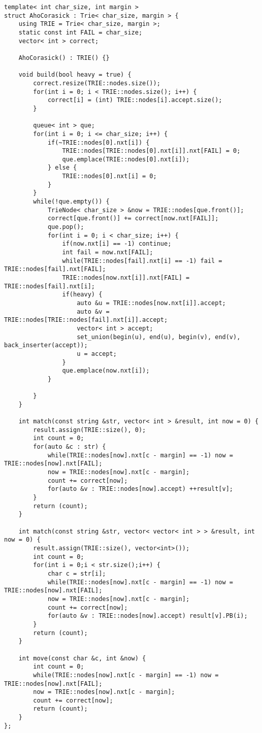 \documentclass[10pt]{article}
\begin{document}
\begin{lstlisting}
template< int char_size, int margin >
struct AhoCorasick : Trie< char_size, margin > {
	using TRIE = Trie< char_size, margin >;
	static const int FAIL = char_size;
	vector< int > correct;

	AhoCorasick() : TRIE() {}

	void build(bool heavy = true) {
		correct.resize(TRIE::nodes.size());
		for(int i = 0; i < TRIE::nodes.size(); i++) {
			correct[i] = (int) TRIE::nodes[i].accept.size();
		}

		queue< int > que;
		for(int i = 0; i <= char_size; i++) {
			if(~TRIE::nodes[0].nxt[i]) {
				TRIE::nodes[TRIE::nodes[0].nxt[i]].nxt[FAIL] = 0;
				que.emplace(TRIE::nodes[0].nxt[i]);
			} else {
				TRIE::nodes[0].nxt[i] = 0;
			}
		}
		while(!que.empty()) {
			TrieNode< char_size > &now = TRIE::nodes[que.front()];
			correct[que.front()] += correct[now.nxt[FAIL]];
			que.pop();
			for(int i = 0; i < char_size; i++) {
				if(now.nxt[i] == -1) continue;
				int fail = now.nxt[FAIL];
				while(TRIE::nodes[fail].nxt[i] == -1) fail = TRIE::nodes[fail].nxt[FAIL];
				TRIE::nodes[now.nxt[i]].nxt[FAIL] = TRIE::nodes[fail].nxt[i];
				if(heavy) {
					auto &u = TRIE::nodes[now.nxt[i]].accept;
					auto &v = TRIE::nodes[TRIE::nodes[fail].nxt[i]].accept;
					vector< int > accept;
					set_union(begin(u), end(u), begin(v), end(v), back_inserter(accept));
					u = accept;
				}
				que.emplace(now.nxt[i]);
			}

		}
	}

	int match(const string &str, vector< int > &result, int now = 0) {
		result.assign(TRIE::size(), 0);
		int count = 0;
		for(auto &c : str) {
			while(TRIE::nodes[now].nxt[c - margin] == -1) now = TRIE::nodes[now].nxt[FAIL];
			now = TRIE::nodes[now].nxt[c - margin];
			count += correct[now];
			for(auto &v : TRIE::nodes[now].accept) ++result[v];
		}
		return (count);
	}

	int match(const string &str, vector< vector< int > > &result, int now = 0) {
		result.assign(TRIE::size(), vector<int>());
		int count = 0;
		for(int i = 0;i < str.size();i++) {
			char c = str[i];
			while(TRIE::nodes[now].nxt[c - margin] == -1) now = TRIE::nodes[now].nxt[FAIL];
			now = TRIE::nodes[now].nxt[c - margin];
			count += correct[now];
			for(auto &v : TRIE::nodes[now].accept) result[v].PB(i);
		}
		return (count);
	}

	int move(const char &c, int &now) {
		int count = 0;
		while(TRIE::nodes[now].nxt[c - margin] == -1) now = TRIE::nodes[now].nxt[FAIL];
		now = TRIE::nodes[now].nxt[c - margin];
		count += correct[now];
		return (count);
	}
};


\end{lstlisting}
\end{document}
